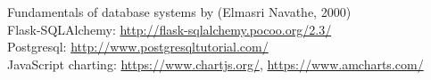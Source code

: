 \cleardoublepage
{}

\begin{thebibliography}{99}

\bibitem{}Fundamentals of database systems by (Elmasri Navathe, 2000)\\

\bibitem{} Flask-SQLAlchemy: \url{http://flask-sqlalchemy.pocoo.org/2.3/}\\

\bibitem{} Postgresql: \url{http://www.postgresqltutorial.com/}\\

\bibitem{} JavaScript charting: \url{https://www.chartjs.org/}, \url{https://www.amcharts.com/}\\

\end{thebibliography}
